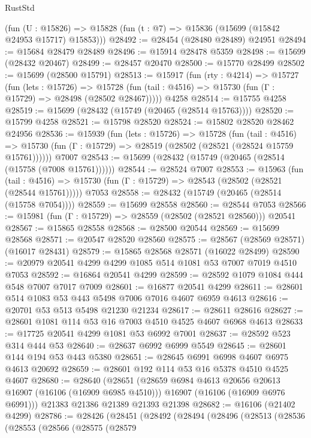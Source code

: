 \begin{lexlean}{RustStd}
\begin{coremodule}
    (fun (U : @15826) => @15828 (fun (t : @7) => @15836 (@15699 (@15842 @24953 @15717) @15853)))
@28492 := @28454 (@28480 @28489) @24951
@28494 := @15684 @28479 @28489
@28496 := @15914 @28478 @5359
@28498 := @15699 (@28432 @20467)
@28499 := @28457 @20470
@28500 := @15770 @28499
@28502 := @15699 (@28500 @15791)
@28513 := @15917
    (fun (rty : @4214) =>
    @15727
      (fun (lets : @15726) =>
      @15728 (fun (tail : @4516) => @15730 (fun (Γ : @15729) => @28498 (@28502 @28467)))))
    @4258
@28514 := @15755 @4258
@28519 := @15699 (@28432 (@15749 (@20465 (@28514 @15763))))
@28520 := @15799 @4258
@28521 := @15798 @28520
@28524 := @15802 @28520 @28462 @24956
@28536 := @15939
    (fun (lets : @15726) =>
    @15728
      (fun (tail : @4516) =>
      @15730 (fun (Γ : @15729) => @28519 (@28502 (@28521 (@28524 @15759 @15761))))))
    @7007
@28543 := @15699 (@28432 (@15749 (@20465 (@28514 (@15758 (@7008 @15761))))))
@28544 := @28524 @7007
@28553 := @15963
    (fun (tail : @4516) => @15730 (fun (Γ : @15729) => @28543 (@28502 (@28521 (@28544 @15761)))))
    @7053
@28558 := @28432 (@15749 (@20465 (@28514 (@15758 @7054))))
@28559 := @15699 @28558
@28560 := @28544 @7053
@28566 := @15981 (fun (Γ : @15729) => @28559 (@28502 (@28521 @28560))) @20541
@28567 := @15865 @28558
@28568 := @28500 @20544
@28569 := @15699 @28568
@28571 := @20547 @28520 @28560
@28575 := @28567 (@28569 @28571) (@16017 @28431)
@28579 := @15865 @28568 @28571 (@16022 @28499)
@28590 := @20979 @20541 @4299 @4299 @1085 @514 @1081 @53 @7007 @7019 @4510 @7053
@28592 := @16864 @20541 @4299
@28599 := @28592 @1079 @1084 @444 @548 @7007 @7017 @7009
@28601 := @16877 @20541 @4299
@28611 := @28601 @514 @1083 @53 @443 @5498 @7006 @7016 @4607 @6959 @4613
@28616 := @20701 @53 @513 @5498 @21230 @21234
@28617 := @28611 @28616
@28627 := @28601 @1081 @114 @53 @16 @7003 @4510 @4525 @4607 @6968 @4613
@28633 := @17725 @20541 @4299 @1081 @53 @6992 @7001
@28637 := @28592 @523 @314 @444 @53
@28640 := @28637 @6992 @6999 @5549
@28645 := @28601 @144 @194 @53 @443 @5380
@28651 := @28645 @6991 @6998 @4607 @6975 @4613 @20692
@28659 := @28601 @192 @114 @53 @16 @5378 @4510 @4525 @4607
@28680 := @28640
    (@28651
      (@28659 @6984 @4613 @20656 @20613 @16907 (@16106 (@16909 @6985 @4510)))
      @16907
      (@16106 (@16909 @6976 @6991)))
    @21383
    @21386
    @21389
    @21393
    @21398
@28682 := @16106 (@21402 @4299)
@28786 := @28426
    (@28451
      (@28492
        (@28494
          (@28496
            (@28513
              (@28536
                (@28553
                  (@28566
                    (@28575
                      (@28579

\end{coremodule}
\end{lexlean}
